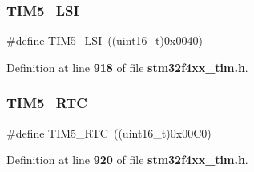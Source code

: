 \subsubsection{T\+I\+M5\+\_\+\+L\+SI}
{\footnotesize\ttfamily \#define T\+I\+M5\+\_\+\+L\+SI~((uint16\+\_\+t)0x0040)}



Definition at line \textbf{ 918} of file \textbf{ stm32f4xx\+\_\+tim.\+h}.

\mbox{\label{group__TIM__Remap_gad95bd2157c29f94703c0942ca3d2b767}} 
\subsubsection{T\+I\+M5\+\_\+\+R\+TC}
{\footnotesize\ttfamily \#define T\+I\+M5\+\_\+\+R\+TC~((uint16\+\_\+t)0x00\+C0)}



Definition at line \textbf{ 920} of file \textbf{ stm32f4xx\+\_\+tim.\+h}.

